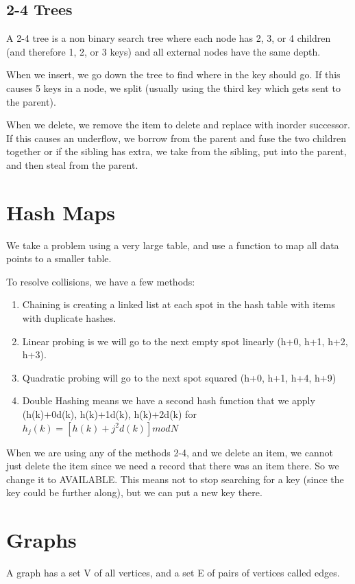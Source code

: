 \documentclass[12pt,letterpaper]{article} \usepackage{amsmath} \usepackage{graphicx} \usepackage[margin=1in]{geometry} \usepackage{longtable}  \usepackage{amssymb}
\begin{document}
	\subsection{2-4 Trees}
	A 2-4 tree is a non binary search tree where each node has 2, 3, or 4 children (and therefore 1, 2, or 3 keys) and all external nodes have the same depth. 
	
	When we insert, we go down the tree to find where in the key should go. If this causes 5 keys in a node, we split (usually using the third key which gets sent to the parent).
	
	When we delete, we remove the item to delete and replace with inorder successor. If this causes an underflow, we borrow from the parent and fuse the two children together or if the sibling has extra, we take from the sibling, put into the parent, and then steal from the parent. 
	
	\section{Hash Maps}
	We take a problem using a very large table, and use a function to map all data points to a smaller table. 
	
	To resolve collisions, we have a few methods:
	\begin{enumerate}[noitemsep]
		\item Chaining is creating a linked list at each spot in the hash table with items with duplicate hashes.
		\item Linear probing is we will go to the next empty spot linearly (h+0, h+1, h+2, h+3).
		\item Quadratic probing will go to the next spot squared (h+0, h+1, h+4, h+9)
		\item Double Hashing means we have a second hash function that we apply (h(k)+0d(k), h(k)+1d(k), h(k)+2d(k) for $h_j(k)=[h(k)+j^2d(k)]mod N$
	\end{enumerate}

	When we are using any of the methods 2-4, and we delete an item, we cannot just delete the item since we need a record that there was an item there. So we change it to AVAILABLE. This means not to stop searching for a key (since the key could be further along), but we can put a new key there.
	
	\section{Graphs}
	A graph has a set V of all vertices, and a set E of pairs of vertices called edges.
	
\end{document}
